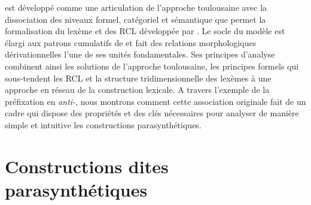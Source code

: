 \documentclass[output=paper]{langsci/langscibook}
\begin{document}


\paradis{} est développé comme une articulation de l'approche toulousaine avec la dissociation des niveaux formel, catégoriel et sémantique que permet la formalisation du lexème et des RCL développée par \cite{Fradin03}.  Le socle du modèle \paradis{} est élargi aux patrons cumulatifs de \cite{Bochner93} et fait des relations morphologiques dérivationnelles l'une de ses unités fondamentales. Ses principes d'analyse combinent ainsi les solutions de l'approche toulousaine, les principes formels qui sous-tendent les RCL et la structure tridimensionnelle des lexèmes à une approche en réseau de la construction lexicale. A travers l'exemple de la préfixation en \emph{\mbox{anti-}}, nous montrons comment cette association originale fait de  \paradis{} un cadre qui dispose des propriétés et des clés nécessaires pour analyser de manière simple et intuitive les constructions parasynthétiques.





\section{Constructions dites parasynthétiques}
\label{sec:analyse-parasynthetiques}
\end{document}
